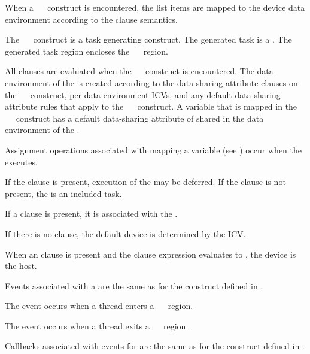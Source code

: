 \descr
When a ~~ construct is encountered, the 
list items are mapped to the device data environment according to the  
clause semantics.

The ~~ construct is a task generating 
construct.  The generated task is a .  The generated task 
region encloses the ~~ region.

All clauses are evaluated when the ~~ 
construct is encountered.  The data environment of the  
is created according to the data-sharing attribute clauses on the 
~~ construct, per-data environment ICVs, 
and any default data-sharing attribute rules that apply to the 
~~ construct.  A variable that is 
mapped in the ~~ construct has a 
default data-sharing attribute of shared in the data environment of 
the .

Assignment operations associated with mapping a variable (see 
) occur when the  executes.

If the  clause is present, execution of the  
may be deferred.  If the  clause is not present, the 
 is an included task.

If a  clause is present, it is associated with the .

If there is no  clause, the default device is determined by 
the  ICV.

When an  clause is present and the  clause expression 
evaluates to , the device is the host.

\events

Events associated with a  are the same as for the  
construct defined in .

The  event occurs when a thread enters a
~~ region.

The  event occurs when a thread exits a
~~ region.

\tools
Callbacks associated with events for  are the same as 
for the  construct defined in .

